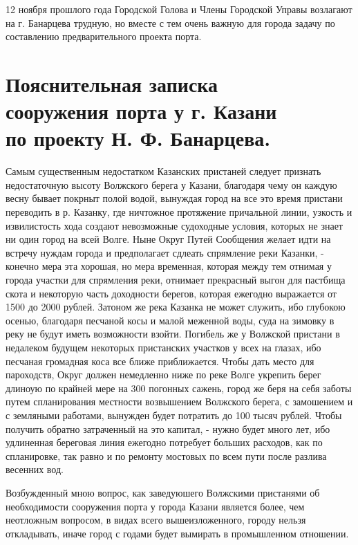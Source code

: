 \documentclass[oneside,final,14pt]{extreport}
\begin{document}
12 ноября прошлого года Городской Голова и Члены Городской Управы возлагают на г. Банарцева трудную, но вместе с тем очень важную для города задачу по составлению предварительного проекта порта.

\newpage

{%
	\centering
	\section*{Пояснительная записка \\сооружения порта у г. Казани\\по проекту Н. Ф. Банарцева.}
}

Самым существенным недостатком Казанских пристаней следует признать недостаточную высоту Волжского берега у Казани, благодаря чему он каждую весну бывает покрныт полой водой, вынуждая город на все это время пристани переводить в р. Казанку, где ничтожное протяжение причальной линии, узкость и извилистость хода создают невозможные судоходные условия, которых не знает ни один город на всей Волге. Ныне Округ Путей Сообщения желает идти на встречу нуждам города и предполагает сдлеать спрямление реки Казанки, - конечно мера эта хорошая, но мера временная, которая между тем отнимая у города участки для спрямления реки, отнимает прекрасный выгон для пастбища скота и некоторую часть доходности берегов, которая ежегодно выражается от 1500 до 2000 рублей. Затоном же река Казанка не может служить, ибо глубокою осенью, благодаря песчаной косы и малой меженной воды, суда на зимовку в реку не будут иметь возможности взойти. Погибель же у Волжской пристани в недалеком будущем некоторых пристанских участков у всех на глазах, ибо песчаная громадная коса все ближе приближается. Чтобы дать место для пароходств, Округ должен немедленно ниже по реке Волге укрепить берег длиноую по крайней мере на 300 погонных сажень, город же беря на себя заботы путем спланирования местности возвышением Волжского берега, с замошением и с земляными работами, вынужден будет потратить до 100 тысяч рублей. Чтобы получить обратно затраченный на это капитал, - нужно будет много лет, ибо удлиненная береговая линия ежегодно потребует больших расходов, как по спланировке, так равно и по ремонту мостовых по всем пути после разлива весенних вод.

Возбужденный мною вопрос, как заведуюшего Волжскими пристанями об необходимости сооружения порта у города Казани является более, чем неотложным вопросом, в видах всего вышеизложенного, городу нельзя откладывать, иначе город с годами будет вымирать в промышленном отношении.
\end{document}
